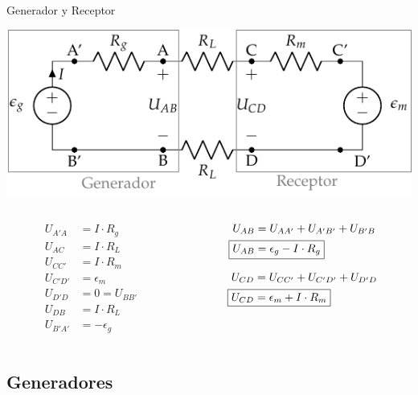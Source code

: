 \documentclass[aspectratio=169, usenames,svgnames,dvipsnames]{beamer}
\begin{document}
\begin{frame}[label={sec:org552d6ef}]{Generador y Receptor}
\begin{center}
\includegraphics[height=0.25\textheight]{../figs/circuito_lkv.pdf}
\end{center}
\begin{columns}
\begin{column}{0.3\columnwidth}
\begin{align*}
  U_{A'A} &= I \cdot R_g\\
  U_{AC} &= I \cdot R_L\\
  U_{CC'} &= I \cdot R_m\\
  U_{C'D'} &= \epsilon_m\\
  U_{D'D} &= 0 = U_{BB'}\\
  U_{DB} &= I \cdot R_L\\
  U_{B'A'} &= -\epsilon_g
\end{align*}
\end{column}
\begin{column}{0.7\columnwidth}
\begin{align*}
  U_{AB} &= U_{AA'} + U_{A'B'} + U_{B'B}\\
  \Aboxed{U_{AB} &= \epsilon_g - I \cdot R_g}
\end{align*}

\begin{align*}
  U_{CD} &= U_{CC'} + U_{C'D'} + U_{D'D}\\
  \Aboxed{U_{CD} &= \epsilon_m + I\cdot R_m}
\end{align*}
\end{column}
\end{columns}
\end{frame}
\subsection{Generadores}
\label{sec:orgad7310b}
\end{document}
